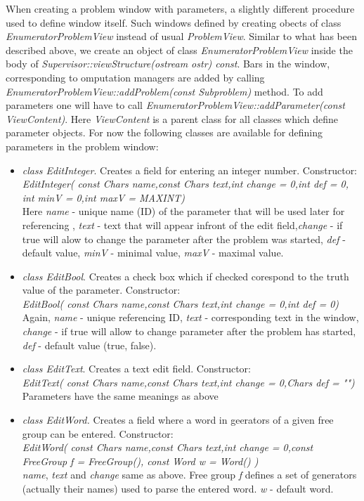 \documentclass[12pt]{article}
\begin{document}
When creating a problem window with parameters, a slightly different
procedure used to define window itself. Such windows defined by creating
obects of class \emph{EnumeratorProblemView} instead of usual \emph{ProblemView}.
Similar to what has been described above, we create an object of 
class \emph{EnumeratorProblemView} inside the body of 
\emph{Supervisor::viewStructure(ostream ostr) const}. Bars in the window, 
corresponding to omputation managers are
added by calling \emph{EnumeratorProblemView::addProblem(const Subproblem)}
method. To add parameters one will have to call 
\emph{EnumeratorProblemView::addParameter(const ViewContent)}.
Here \emph{ViewContent} is a parent class for all classes which define
 parameter objects. For now the following classes are available
for defining parameters in the problem window:
\begin{itemize}
\item \emph{class EditInteger}. Creates a field for entering an integer
number. Constructor:\\
 \emph{EditInteger( const Chars name,const Chars text,int change = 0,int def = 0, int minV = 0,int maxV = MAXINT)} \\
Here \emph{name} - unique name (ID) of the parameter that will be used later for
referencing , \emph{text} - text that will appear infront of the
edit field,\emph{change} - if true will alow to change the parameter
after the problem was started, \emph{def} - default value,
 \emph{minV} - minimal value, \emph{maxV} - maximal value.
\item \emph{class EditBool}. Creates a check box which if checked corespond
to the truth value of the parameter. Constructor: \\
\emph{ EditBool( const Chars name,const Chars text,int change = 0,int def = 0)} \\
Again, \emph{name} - unique referencing ID, \emph{text} - corresponding text in the
window, \emph{change} - if true will allow to change parameter after
the problem has started, \emph{def} - default value (true, false).
\item \emph{class EditText}. Creates a text edit field. Constructor: \\
\emph{EditText( const Chars name,const Chars text,int change = 0,Chars def = "")}\\
Parameters have the same meanings as above
\item \emph{class EditWord.} Creates a field where a word in geerators
of a given free group can be entered. Constructor: \\
\emph{EditWord( const Chars name,const Chars text,int change = 0,const FreeGroup f = FreeGroup(), const Word w = Word() )} \\
\emph{name}, \emph{text} and \emph{change} same as above. Free group \emph{f}
defines a set of generators (actually their names) used to parse the 
entered word. \emph{w} - default word.

\end{itemize}
\end{document}

